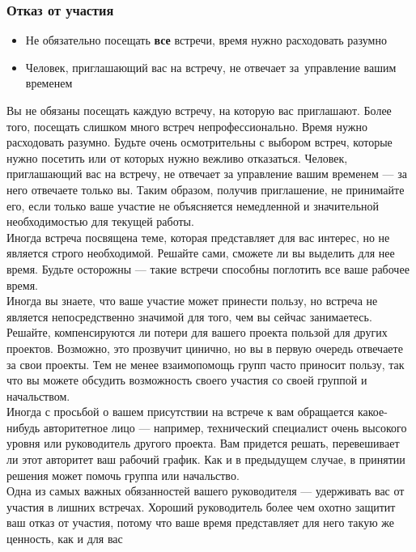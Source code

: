 \documentclass{../industrial-development}
\begin{document}
\begin{frame} \frametitle{Отказ от участия}
\begin{itemize}
  \item Не обязательно посещать \textbf{все} встречи, время нужно расходовать разумно
  \item Человек, приглашающий вас на встречу, не отвечает за~управление вашим временем
\end{itemize}
\end{frame}
\lecturenotes
Вы не обязаны посещать каждую встречу, на которую вас приглашают. Более того, посещать слишком много встреч непрофессионально. Время нужно расходовать разумно. Будьте очень осмотрительны с выбором встреч, которые нужно посетить или от которых нужно вежливо отказаться. Человек, приглашающий вас на встречу, не отвечает за управление вашим временем — за него отвечаете только вы. Таким образом, получив приглашение, не принимайте его, если только ваше участие не объясняется немедленной и значительной необходимостью для текущей работы.\\
Иногда встреча посвящена теме, которая представляет для вас интерес, но не является строго необходимой. Решайте сами, сможете ли вы выделить для нее время. Будьте осторожны — такие встречи способны поглотить все ваше рабочее время.\\
Иногда вы знаете, что ваше участие может принести пользу, но встреча не является непосредственно значимой для того, чем вы сейчас занимаетесь. Решайте, компенсируются ли потери для вашего проекта пользой для других проектов. Возможно, это прозвучит цинично, но вы в первую очередь отвечаете за свои проекты. Тем не менее взаимопомощь групп часто приносит пользу, так что вы можете обсудить возможность своего участия со своей группой и начальством.\\
Иногда с просьбой о вашем присутствии на встрече к вам обращается какое-нибудь авторитетное лицо — например, технический специалист очень высокого уровня или руководитель другого проекта. Вам придется решать, перевешивает ли этот авторитет ваш рабочий график. Как и в предыдущем случае, в принятии решения может помочь группа или начальство.\\
Одна из самых важных обязанностей вашего руководителя — удерживать вас от участия в лишних встречах. Хороший руководитель более чем охотно защитит ваш отказ от участия, потому что ваше время представляет для него такую же ценность, как и для вас
\end{document}
